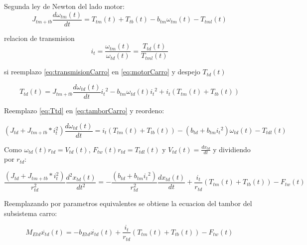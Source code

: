 \documentclass{article}
\begin{document}
            Segunda ley de Newton del lado motor:
            \begin{equation} \label{eq:motorCarro}
                J_{tm+tb} \frac{d \omega_{tm}(t)}{dt} = T_{tm}(t) + T_{tb}(t) - b_{tm} \omega_{tm}(t) - T_{tml}(t)
            \end{equation}

            relacion de transmision
            \begin{equation} \label{eq:transmisionCarro}
                i_t = \frac{\omega_{tm}(t)}{\omega_{td}(t)} = \frac{T_{td}(t)}{T_{tml}(t)}
            \end{equation}

            si reemplazo \ref{eq:transmisionCarro} en \ref{eq:motorCarro} y despejo $T_{td}(t)$

            \begin{equation} \label{eq:Ttd}
                T_{td}(t) = J_{tm+tb} \frac{d \omega_{td}(t)}{dt} {i_t}^2 - b_{tm} \omega_{td}(t) {i_t}^2 + i_t (T_{tm}(t) + T_{tb}(t))
            \end{equation}

            Reemplazo \ref{eq:Ttd} en \ref{eq:tamborCarro} y reordeno:

            \begin{equation} \label{eq:carroTtdl}
                (J_{td} + J_{tm+tb}*i_t^2) \frac{d \omega_{td}(t)}{dt} = i_t (T_{tm}(t) + T_{tb}(t)) - (b_{td} + b_{tm}{i_t}^2) \omega_{td}(t) - T_{tdl}(t)
            \end{equation}
        
            Como $\omega_{td}(t) r_{td} = V_{td}(t)$, $F_{tw}(t)r_{td} = T_{tdl}(t)$ y $V_{td}(t) = \frac{d x_{td}}{dt}$ y dividiendo por $r_{td}$:
            
            \begin{equation} \label{eq:carroFtw}
                \frac{(J_{td} + J_{tm+tb}*i_t^2)}{r_{td}^2} \frac{d^2 x_{td}(t)}{dt^2} = - \frac{(b_{td} + b_{tm}{i_t}^2)}{r_{td}^2} \frac{d x_{td}(t)}{dt} + \frac{i_t}{r_{td}} (T_{tm}(t) + T_{tb}(t)) - F_{tw}(t)
            \end{equation}

            Reemplazando por parametros equivalentes se obtiene la ecuacion del tambor del subsistema carro:

            \begin{equation} \label{eq:TamborCarro}
                M_{Etd} \ddot{x_{td}}(t) = - b_{Etd} \dot{x_{td}}(t) + \frac{i_t}{r_{td}} (T_{tm}(t) + T_{tb}(t)) - F_{tw}(t)
            \end{equation}
\end{document}
